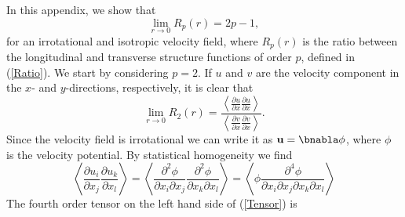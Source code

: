 

In this appendix,  we show that \begin{equation}  \lim_{r \rightarrow 0}  R_p (r) =  2p -1, \end{equation}
for an irrotational and isotropic velocity field, 
where  $ R_p (r ) $ is the ratio between the longitudinal and transverse structure functions of order $ p $, defined in (\ref{Ratio}).
We start by considering $ p = 2 $.   If $ u $ and $ v $ are the velocity component in the $ x $- and $ y $-directions, respectively, it is clear that
\begin{equation}
 \lim_{r \rightarrow 0}  R_2 (r) = \frac{\left \langle \frac{\partial u}{\partial x}  \frac{\partial u}{\partial x}  \right \rangle} {\left \langle \frac{\partial v}{\partial x}  \frac{\partial v}{\partial x}  \right \rangle} .
\end{equation} 
Since the velocity field is irrotational we can write it as $ {\bf u} = \bnabla \phi $, where $ \phi $ is the velocity potential. By statistical homogeneity we find
\begin{equation} \label{Tensor}
\left \langle \frac{\partial u_i}{\partial x_j}  \frac{\partial u_k}{\partial x_l}  \right \rangle = \left \langle  \frac{\partial ^2 \phi}{\partial x_i \partial x_j}  \frac{\partial ^2 \phi}{\partial x_k\partial x_l} \right  \rangle = 
\left \langle \phi \frac{\partial^4 \phi}{\partial x_i \partial x_j \partial x_k \partial x_l }\right \rangle 
\end{equation} 
The fourth order tensor on the left hand side of (\ref{Tensor}) is 

